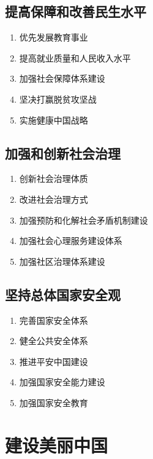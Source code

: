     \subsection{提高保障和改善民生水平}
        \begin{enumerate}
            \item 优先发展教育事业
            \item 提高就业质量和人民收入水平
            \item 加强社会保障体系建设
            \item 坚决打赢脱贫攻坚战
            \item 实施健康中国战略
        \end{enumerate}

    \subsection{加强和创新社会治理}
        \begin{enumerate}
            \item 创新社会治理体质
            \item 改进社会治理方式
            \item 加强预防和化解社会矛盾机制建设
            \item 加强社会心理服务建设体系
            \item 加强社区治理体系建设
        \end{enumerate}

    \subsection{坚持总体国家安全观}
        \begin{enumerate}
            \item 完善国家安全体系
            \item 健全公共安全体系
            \item 推进平安中国建设
            \item 加强国家安全能力建设
            \item 加强国家安全教育
        \end{enumerate}


\section{建设美丽中国}
